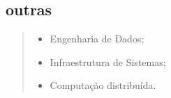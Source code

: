 \subsection{ outras}
\begin{quote}

   \begin{itemize}
      \item Engenharia de Dados;
      \item Infraestrutura de Sistemas;
      \item Computação distribuída.
   \end{itemize}
\end{quote}
